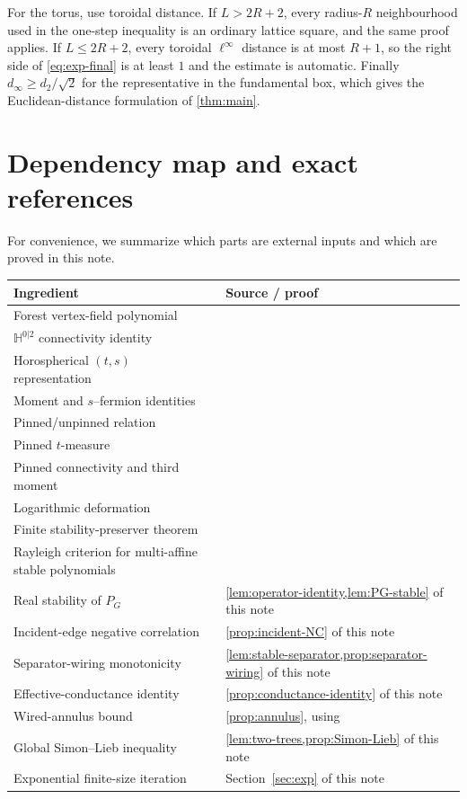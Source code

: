 \documentclass[11pt]{article}
\theoremstyle{definition}
\theoremstyle{remark}
\newcommand{\HH}{\mathbb H}
\newcommand{\1}{\mathbf 1}
\begin{document}
For the torus, use toroidal distance.  If $L>2R+2$, every radius-$R$ neighbourhood
used in the one-step inequality is an ordinary lattice square, and the same proof
applies.  If $L\le2R+2$, every toroidal $\ell^\infty$ distance is at most $R+1$, so
the right side of \eqref{eq:exp-final} is at least $1$ and the estimate is automatic.
Finally $d_\infty\ge d_2/\sqrt2$ for the representative in the fundamental box, which
gives the Euclidean-distance formulation of \cref{thm:main}.

\section{Dependency map and exact references}

For convenience, we summarize which parts are external inputs and which are proved in
this note.

\begin{center}
\begin{tabular}{p{}p{}}
\hline
Ingredient & Source / proof\\
\hline
Forest vertex-field polynomial & \cite[Theorem~2.1, (2.8)]{BCHS}\\
$\HH^{0|2}$ connectivity identity & \cite[Corollary~2.2, (2.11)]{BCHS}\\
Horospherical $(t,s)$ representation & \cite[Proposition~2.9, (2.59)--(2.62)]{BCHS}\\
Moment and $s$--fermion identities & \cite[Corollary~2.10, (2.63)--(2.64)]{BCHS}\\
Pinned/unpinned relation & \cite[Proposition~2.12, (2.79)--(2.80)]{BCHS}\\
Pinned $t$-measure & \cite[Corollary~2.13, (2.84)--(2.85)]{BCHS}\\
Pinned connectivity and third moment & \cite[Corollary~2.14, (2.86)--(2.87)]{BCHS}\\
Logarithmic deformation & \cite[(4.4), Lemma~4.1, (4.5)--(4.6)]{BCHS}\\
Finite stability-preserver theorem & \cite[Theorem~1.1]{BB}\\
Rayleigh criterion for multi-affine stable polynomials & \cite[Theorem~4.1]{BBL}\\
Real stability of $P_G$ & \cref{lem:operator-identity,lem:PG-stable} of this note\\
Incident-edge negative correlation & \cref{prop:incident-NC} of this note\\
Separator-wiring monotonicity & \cref{lem:stable-separator,prop:separator-wiring} of this note\\
Effective-conductance identity & \cref{prop:conductance-identity} of this note\\
Wired-annulus bound & \cref{prop:annulus}, using \cite[Lemma~4.1]{BCHS}\\
Global Simon--Lieb inequality & \cref{lem:two-trees,prop:Simon-Lieb} of this note\\
Exponential finite-size iteration & Section~\ref{sec:exp} of this note\\
\hline
\end{tabular}
\end{center}
\end{document}

